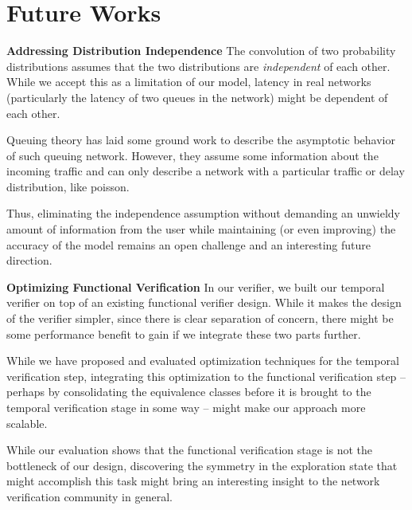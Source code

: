 \section{Future Works}
\textbf{Addressing Distribution Independence}
The convolution of two probability distributions assumes that the two distributions are \textit{independent}
of each other.
While we accept this as a limitation of our model, latency in real networks (particularly the latency of two 
queues in the network) might be dependent of each other.

Queuing theory has laid some ground work to describe the asymptotic behavior of such queuing network.
However, they assume some information about the incoming traffic and can only describe a network with a 
particular traffic or delay distribution, like poisson.

Thus, eliminating the independence assumption without demanding an unwieldy amount of information from 
the user while maintaining (or even improving) the accuracy of the model remains an open challenge and an 
interesting future direction.

\textbf{Optimizing Functional Verification}
In our verifier, we built our temporal verifier on top of an existing functional verifier design.
While it makes the design of the verifier simpler, since there is clear separation of concern, there 
might be some performance benefit to gain if we integrate these two parts further.

While we have proposed and evaluated optimization techniques for the temporal verification step, 
integrating this optimization to the functional verification step -- perhaps by consolidating the 
equivalence classes before it is brought to the temporal verification stage in some way -- might make 
our approach more scalable.

While our evaluation shows that the functional verification stage is not the bottleneck of our design, 
discovering the symmetry in the exploration state that might accomplish this task might bring an interesting 
insight to the network verification community in general.